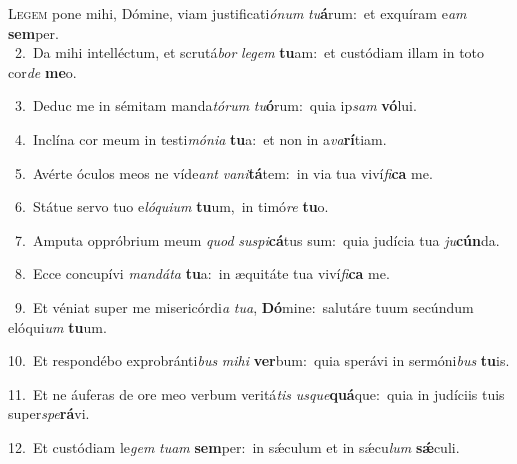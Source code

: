 \lettrine{\initial\textcolor{\initialcolor}{L}}{egem} pone mihi, Dómine, viam justificati\-\textit{ó}\-\textit{num} \textit{tu}\-\textbf{á}rum:~\star et exquíram e\textit{am} \textbf{sem}\-per.\\
{\numbfont\textcolor{\numbcolor}{~2.}}~Da mihi intelléctum, et scrutá\textit{bor} \textit{le}\-\textit{gem} \textbf{tu}\-am:~\star et custódiam illam in toto cor\textit{de} \textbf{me}\-o.\par
{\numbfont\textcolor{\numbcolor}{~3.}}~Deduc me in sémitam manda\-\textit{tó}\-\textit{rum} \textit{tu}\-\textbf{ó}rum:~\star quia ip\textit{sam} \textbf{vó}\-lui.\par
{\numbfont\textcolor{\numbcolor}{~4.}}~Inclína cor meum in testi\-\textit{mó}\-\textit{ni}\textit{a} \textbf{tu}\-a:~\star et non in a\-\textit{va}\-\textbf{rí}tiam.\par
{\numbfont\textcolor{\numbcolor}{~5.}}~Avérte óculos meos ne víde\textit{ant} \textit{va}\-\textit{ni}\textbf{tá}tem:~\star in via tua viví\-\textit{fi}\-\textbf{ca} me.\par
{\numbfont\textcolor{\numbcolor}{~6.}}~Státue servo tuo e\-\textit{ló}\-\textit{qui}\textit{um} \textbf{tu}\-um,~\star in timó\textit{re} \textbf{tu}\-o.\par
{\numbfont\textcolor{\numbcolor}{~7.}}~Amputa oppróbrium meum \textit{quod} \textit{su}\-\textit{spi}\textbf{cá}tus sum:~\star quia judícia tua \textit{ju}\-\textbf{cún}da.\par
{\numbfont\textcolor{\numbcolor}{~8.}}~Ecce concupívi \textit{man}\-\textit{dá}\textit{ta} \textbf{tu}\-a:~\star in æquitáte tua viví\-\textit{fi}\-\textbf{ca} me.\par
{\numbfont\textcolor{\numbcolor}{~9.}}~Et véniat super me misericórdi\textit{a} \textit{tu}\-\textit{a}, \textbf{Dó}\-mine:~\star salutáre tuum secúndum elóqui\textit{um} \textbf{tu}\-um.\par
{\numbfont\textcolor{\numbcolor}{10.}}~Et respondébo exprobránti\textit{bus} \textit{mi}\-\textit{hi} \textbf{ver}\-bum:~\star quia sperávi in sermóni\textit{bus} \textbf{tu}\-is.\par
{\numbfont\textcolor{\numbcolor}{11.}}~Et ne áuferas de ore meo verbum veritá\textit{tis} \textit{us}\-\textit{que}\textbf{quá}que:~\star quia in judíciis tuis super\-\textit{spe}\-\textbf{rá}vi.\par
{\numbfont\textcolor{\numbcolor}{12.}}~Et custódiam le\textit{gem} \textit{tu}\-\textit{am} \textbf{sem}\-per:~\star in sǽculum et in sǽcu\textit{lum} \textbf{sǽ}\-culi.\par
